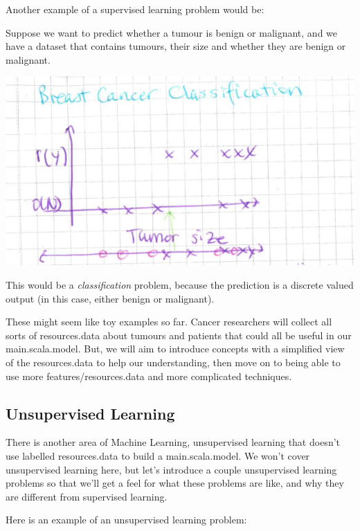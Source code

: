 \documentclass[12pt]{article}
\begin{document}
Another example of a supervised learning problem would be:

Suppose we want to predict whether a tumour is benign or malignant, and we have a dataset that contains tumours, their size and whether they are benign or malignant.

\includegraphics[width={\textwidth}]{tumour-size}

This would be a \textit{classification} problem, because the prediction is a discrete valued output (in this case, either benign or malignant). 

These might seem like toy examples so far. Cancer researchers will collect all sorts of resources.data about tumours and patients that could all be useful in our main.scala.model. But, we will aim to introduce concepts with a simplified view of the resources.data to help our understanding, then move on to being able to use more features/resources.data and more complicated techniques.

\subsection{Unsupervised Learning}

There is another area of Machine Learning, unsupervised learning that doesn't use labelled resources.data to build a main.scala.model. We won't cover unsupervised learning here, but let's introduce a couple unsupervised learning problems so that we'll get a feel for what these problems are like, and why they are different from supervised learning.

Here is an example of an unsupervised learning problem:
\end{document}
